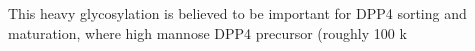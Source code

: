 This heavy glycosylation is believed to be important for DPP4 sorting and maturation, where high mannose DPP4 precursor (roughly 100 k \cite{Matter_1991}